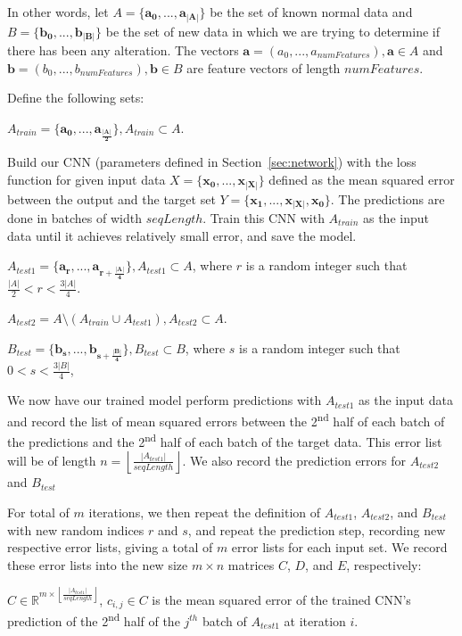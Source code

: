 \documentclass{acm_proc_article-sp}
\renewcommand{\vec}[1]{\mathbf{#1}}
\begin{document}
  In other words, let $A = \{\vec{a_0},...,\vec{a_{|A|}}\}$ be the set of known normal data and $B = \{\vec{b_0},...,\vec{b_{|B|}}\}$ be the set of new data in which we are trying to determine if there has been any alteration. The vectors $\vec{a} = (a_0,...,a_{numFeatures}),\vec{a}\in A$ and $\vec{b} = (b_0,...,b_{numFeatures}),\vec{b}\in B$ are feature vectors of length $numFeatures$.

  Define the following sets:
  
  $A_{train}=\{\vec{a_0},...,\vec{a_{\frac{|A|}{2}}}\},A_{train}\subset{A}$.

  Build our CNN (parameters defined in Section~\ref{sec:network}) with the loss function for given input data $X = \{\vec{x_0},...,\vec{x_{|X|}}\}$ defined as the mean squared error between the output and the target set $Y = \{\vec{x_1},...,\vec{x_{|X|}},\vec{x_0}\}$. The predictions are done in batches of width $seqLength$. Train this CNN with $A_{train}$ as the input data until it achieves relatively small error, and save the model.

  $A_{test1} = \{\vec{a_r},...,\vec{a_{r+\frac{|A|}{4}}}\},A_{test1}\subset{A}$, where $r$ is a random integer such that \(\frac{|A|}{2}<r<\frac{3|A|}{4}\).
  
  $A_{test2} = A \setminus (A_{train} \cup A_{test1}),A_{test2}\subset{A}$.

  $B_{test} = \{\vec{b_s},...,\vec{b_{s+\frac{|B|}{4}}}\},B_{test}\subset{B}$, where $s$ is a random integer such that $0<s<\frac{3|B|}{4}$,

  We now have our trained model perform predictions with $A_{test1}$ as the input data and record the list of mean squared errors between the 2\textsuperscript{nd} half of each batch of the predictions and the 2\textsuperscript{nd} half of each batch of the target data. This error list will be of length $n = \left \lfloor \frac{|A_{test1}|}{seqLength} \right \rfloor$. We also record the prediction errors for $A_{test2}$ and $B_{test}$
  
  For total of $m$ iterations, we then repeat the definition of $A_{test1}$, $A_{test2}$, and $B_{test}$ with new random indices $r$ and $s$, and repeat the prediction step, recording new respective error lists, giving a total of $m$ error lists for each input set. We record these error lists into the new size $m \times n$ matrices $C$, $D$, and $E$, respectively:

  $C \in \mathbb{R}^{m \times \left \lfloor \frac{|A_{test1}|}{seqLength} \right \rfloor}$, $c_{i,j} \in C$ is the mean squared error of the trained CNN's prediction of the 2\textsuperscript{nd} half of the $j^{th}$ batch of $A_{test1}$ at iteration $i$.
\end{document}
